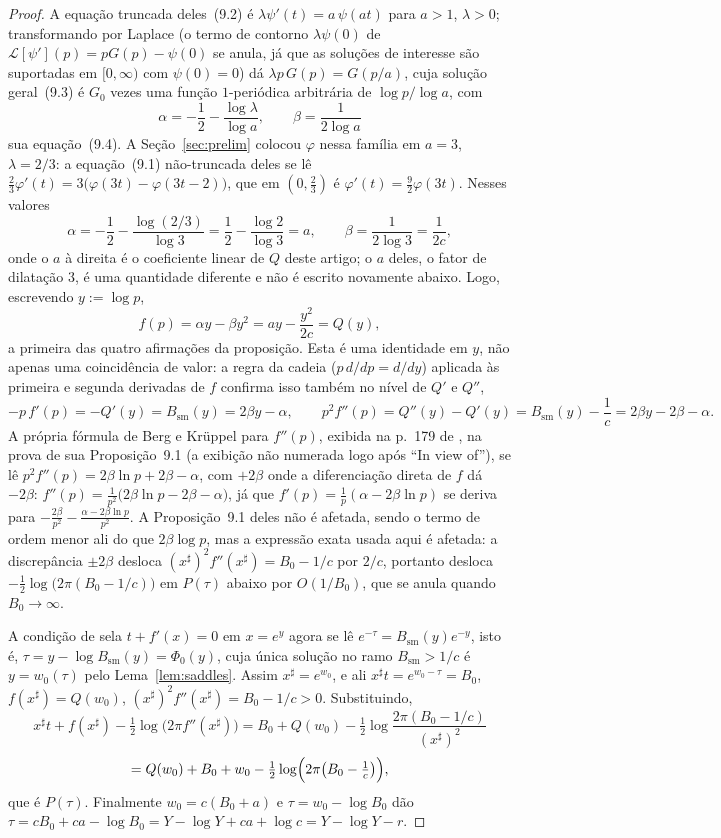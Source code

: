 \documentclass[11pt]{amsart}
\theoremstyle{plain}
\theoremstyle{definition}
\theoremstyle{remark}
\begin{document}
\begin{proof}
A equação truncada deles~(9.2) é $\lambda \psi'(t) = a\,\psi(at)$ para $a>1$, $\lambda>0$;
transformando por Laplace (o termo de contorno $\lambda\psi(0)$ de $\mathcal L[\psi'](p)=pG(p)-\psi(0)$
se anula, já que as soluções de interesse são suportadas em $[0,\infty)$ com $\psi(0)=0$) dá $\lambda
p\,G(p) = G(p/a)$, cuja solução geral~(9.3) é $G_0$ vezes uma função $1$-periódica arbitrária de
$\log p/\log a$, com
\[
\alpha = -\frac12-\frac{\log\lambda}{\log a}, \qquad \beta = \frac{1}{2\log a}
\]
sua equação~(9.4). A Seção~\ref{sec:prelim} colocou $\varphi$ nessa família em $a=3$, $\lambda=2/3$:
a equação~(9.1) não-truncada deles se lê $\tfrac23\varphi'(t) = 3\bigl(\varphi(3t) -
\varphi(3t-2)\bigr)$, que em $(0,\tfrac23)$ é $\varphi'(t) = \tfrac92\varphi(3t)$. Nesses valores
\[
\alpha = -\frac12-\frac{\log(2/3)}{\log3} = \frac12-\frac{\log2}{\log3} = a, \qquad
\beta = \frac{1}{2\log3} = \frac{1}{2c},
\]
onde o $a$ à direita é o coeficiente linear de $Q$ deste artigo; o $a$ deles, o fator de dilatação
$3$, é uma quantidade diferente e não é escrito novamente abaixo. Logo, escrevendo $y := \log p$,
\[
f(p) = \alpha y-\beta y^2 = a y - \frac{y^2}{2c} = Q(y),
\]
a primeira das quatro afirmações da proposição. Esta é uma identidade em $y$, não apenas uma
coincidência de valor: a regra da cadeia ($p\,d/dp = d/dy$) aplicada às primeira e segunda
derivadas de $f$ confirma isso também no nível de $Q'$ e $Q''$,
\[
-p\,f'(p) = -Q'(y) = B_{\mathrm{sm}}(y) = 2\beta y-\alpha, \qquad
p^2f''(p) = Q''(y)-Q'(y) = B_{\mathrm{sm}}(y)-\frac1c = 2\beta y-2\beta-\alpha .
\]
A própria fórmula de Berg e Kr\"uppel para $f''(p)$, exibida na p.~179 de \cite{bergkruppel1998},
na prova de sua Proposição~9.1 (a exibição não numerada logo após ``In view of''), se lê
$p^2f''(p)=2\beta\ln p+2\beta-\alpha$, com $+2\beta$ onde a diferenciação direta de $f$ dá $-2\beta$:
$f''(p) = \tfrac{1}{p^2}\bigl(2\beta\ln p - 2\beta - \alpha\bigr)$, já que
$f'(p)=\tfrac1p(\alpha-2\beta\ln p)$ se deriva para $-\tfrac{2\beta}{p^2}-\tfrac{\alpha-2\beta\ln
p}{p^2}$. A Proposição~9.1 deles não é afetada, sendo o termo de ordem menor ali do que
$2\beta\log p$, mas a expressão exata usada aqui é afetada: a discrepância $\pm2\beta$ desloca
$(x^\sharp)^2f''(x^\sharp) = B_0-1/c$ por $2/c$, portanto desloca $-\tfrac12\log\bigl(2\pi
(B_0-1/c)\bigr)$ em $P(\tau)$ abaixo por $O(1/B_0)$, que se anula quando $B_0\to\infty$.

A condição de sela $t+f'(x)=0$ em $x=e^y$ agora se lê $e^{-\tau} = B_{\mathrm{sm}}(y)e^{-y}$, isto
é, $\tau = y-\log B_{\mathrm{sm}}(y) = \Phi_0(y)$, cuja única solução no ramo $B_{\mathrm{sm}}>1/c$
é $y = w_0(\tau)$ pelo Lema~\ref{lem:saddles}. Assim $x^\sharp = e^{w_0}$, e ali $x^\sharp t =
e^{w_0-\tau} = B_0$, $f(x^\sharp) = Q(w_0)$, $(x^\sharp)^2f''(x^\sharp) = B_0 - 1/c>0$. Substituindo,
\[
x^\sharp t+f(x^\sharp)-\tfrac12\log\bigl(2\pi f''(x^\sharp)\bigr)
= B_0+Q(w_0)-\tfrac12\log\frac{2\pi(B_0-1/c)}{(x^\sharp)^2}
\]
\[
= Q(w_0)+B_0+w_0-\tfrac12\log\Bigl(2\pi\bigl(B_0-\tfrac1c\bigr)\Bigr),
\]
que é $P(\tau)$. Finalmente $w_0 = c(B_0+a)$ e $\tau = w_0-\log B_0$ dão $\tau = cB_0+ca-\log
B_0 = Y-\log Y+ca+\log c = Y-\log Y-r$.
\end{proof}
\end{document}

